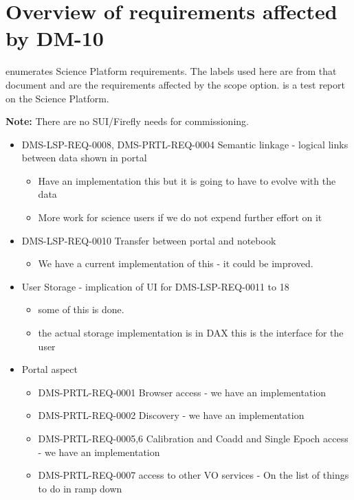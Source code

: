 \section { Overview of requirements affected by DM-10}\label{sect:reqs}
 enumerates Science Platform requirements.
The labels used here are from that document and are the requirements affected by the scope option.
 is a test report on the Science Platform.

\textbf{Note:} There are no SUI/Firefly needs for commissioning.
\begin{itemize}
\item DMS-LSP-REQ-0008, DMS-PRTL-REQ-0004 Semantic linkage - logical links between data shown in portal
\begin{itemize}
\item Have an implementation this but it is going to have to evolve with the data
\item More work for science users if we do not expend further effort on it
\end{itemize}

\item DMS-LSP-REQ-0010 Transfer between portal and notebook
\begin{itemize}
\item We have a current implementation of this - it could be improved.
\end{itemize}
\item User Storage - implication of UI for DMS-LSP-REQ-0011 to 18
\begin{itemize}
\item some of this is done.
\item the actual storage implementation is in DAX this is the interface for the user
\end{itemize}
\item Portal aspect
\begin{itemize}
\item DMS-PRTL-REQ-0001 Browser access  - we have an implementation
\item DMS-PRTL-REQ-0002 Discovery  - we have an implementation
\item DMS-PRTL-REQ-0005,6 Calibration and Coadd and Single Epoch access  - we have an implementation
\item DMS-PRTL-REQ-0007 access to other VO services - On the list of things to do in ramp down
\end{itemize}


\end{itemize}
